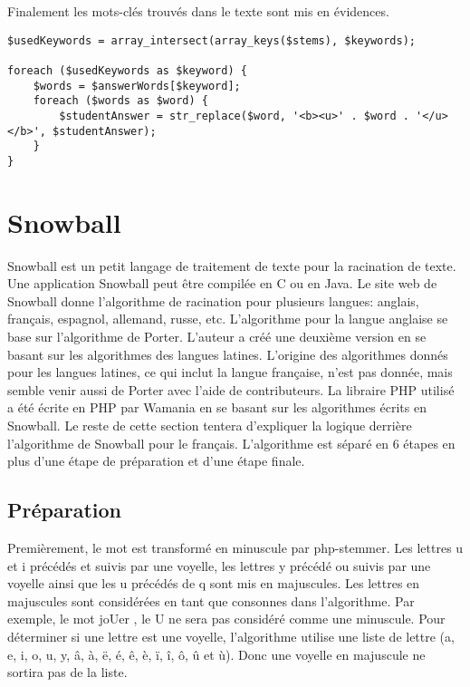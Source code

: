 Finalement les mots-clés trouvés dans le texte sont mis en évidences.

\begin{lstlisting}[frame=l]
$usedKeywords = array_intersect(array_keys($stems), $keywords);

foreach ($usedKeywords as $keyword) {
	$words = $answerWords[$keyword];
	foreach ($words as $word) {
		$studentAnswer = str_replace($word, '<b><u>' . $word . '</u></b>', $studentAnswer);
	}
}
\end{lstlisting}

\section{Snowball}

Snowball est un petit langage de traitement de texte pour la racination de texte.
Une application Snowball peut être compilée en C ou en Java.
Le site web de Snowball donne l'algorithme de racination pour plusieurs langues: anglais, français, espagnol, allemand, russe, etc.
L'algorithme pour la langue anglaise se base sur l'algorithme de Porter.
L'auteur a créé une deuxième version en se basant sur les algorithmes des langues latines.
L'origine des algorithmes donnés pour les langues latines, ce qui inclut la langue française, n'est pas donnée, mais semble venir aussi de Porter avec l'aide de contributeurs.
La libraire PHP utilisé a été écrite en PHP par Wamania en se basant sur les algorithmes écrits en Snowball.
Le reste de cette section tentera d'expliquer la logique derrière l'algorithme de Snowball pour le français.
L'algorithme est séparé en 6 étapes en plus d'une étape de préparation et d'une étape finale.

\subsection*{Préparation}

Premièrement, le mot est transformé en minuscule par php-stemmer.
Les lettres u et i précédés et suivis par une voyelle, les lettres y précédé ou suivis par une voyelle ainsi que les u précédés de q sont mis en majuscules.
Les lettres en majuscules sont considérées en tant que consonnes dans l'algorithme.
Par exemple, le mot \og joUer \fg{}, le U ne sera pas considéré comme une minuscule.
Pour déterminer si une lettre est une voyelle, l'algorithme utilise une liste de lettre (a, e, i, o, u, y, â, à, ë, é, ê, è, ï, î, ô, û et ù).
Donc une voyelle en majuscule ne sortira pas de la liste.

